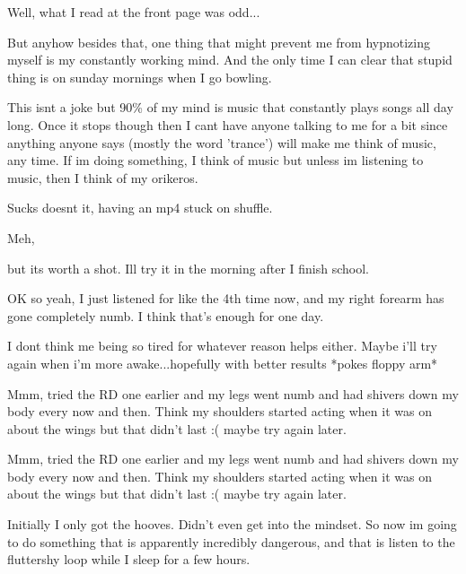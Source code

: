 \documentclass[ebook,12pt,oneside,openany]{memoir}
\newcommand{\mytexttilde}{\raisebox{0.5ex}{\texttildelow}}
\begin{document}
\begin{tcolorbox}[title=Milk Wave]
\par{Well, what I read at the front page was odd...}
\par{But anyhow besides that, one thing that might prevent me from hypnotizing myself is my constantly working mind. And the only time I can clear that stupid thing is on sunday mornings when I go bowling.}
\par{This isnt a joke but 90\% of my mind is music that constantly plays songs all day long. Once it stops though then I cant have anyone talking to me for a bit since anything anyone says (mostly the word 'trance') will make me think of music, any time. If im doing something, I think of music but unless im listening to music, then I think of my orikeros.}
\par{Sucks doesnt it, having an mp4 stuck on shuffle.}
\par{Meh,}
\par{but its worth a shot. Ill try it in the morning after I finish school.}
\end{tcolorbox}
\begin{tcolorbox}[title=\mytexttilde{}Chaotic Parsley\mytexttilde{},colback=cyan!5!white,colframe=cyan!75!black,coltitle=white]
\begin{tcolorbox}[title=Creeping Dusk]
\par{OK so yeah, I just listened for like the 4th time now, and my right forearm has gone completely numb. I think that's enough for one day. }
\par{I dont think me being so tired for whatever reason helps either. Maybe i'll try again when i'm more awake...hopefully with better results *pokes floppy arm*}
\end{tcolorbox}
\par{Mmm, tried the RD one earlier and my legs went numb and had shivers down my body every now and then. Think my shoulders started acting when it was on about the wings but that didn't last :( maybe try again later. }
\end{tcolorbox}
\begin{tcolorbox}[title=Agent505,colback=pink!5!white,colframe=pink!75!black,coltitle=white]
\begin{tcolorbox}[title=Parsleyshy]
\par{Mmm, tried the RD one earlier and my legs went numb and had shivers down my body every now and then. Think my shoulders started acting when it was on about the wings but that didn't last :( maybe try again later. }
\end{tcolorbox}
\par{Initially I only got the hooves. Didn't even get into the mindset. So now im going to do something that is apparently incredibly dangerous, and that is listen to the fluttershy loop while I sleep for a few hours. }
\end{tcolorbox}
\end{document}
